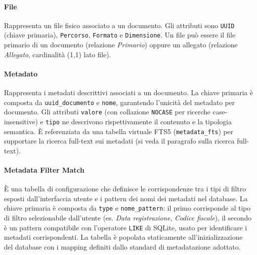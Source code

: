 \documentclass[a4paper,12pt]{article}
\begin{document}
{{{            \paragraph{File}
                Rappresenta un file fisico associato a un documento. Gli attributi sono 
                \texttt{UUID} (chiave primaria), \texttt{Percorso}, \texttt{Formato} e 
                \texttt{Dimensione}. Un file può essere il file primario di un documento 
                (relazione \textit{Primario}) oppure un allegato (relazione 
                \textit{Allegato}, cardinalità (1,1) lato file).

            \paragraph{Metadato}
                Rappresenta i metadati descrittivi associati a un documento. La chiave 
                primaria è composta da \texttt{uuid\_documento} e \texttt{nome}, 
                garantendo l'unicità del metadato per documento. Gli attributi \texttt{valore} 
                (con collazione \texttt{NOCASE} per ricerche case-insensitive) e \texttt{tipo} 
                ne descrivono rispettivamente il contenuto e la tipologia semantica. 
                È referenziata da una tabella virtuale FTS5 (\texttt{metadata\_fts}) per 
                supportare la ricerca full-text sui metadati (si veda il paragrafo 
                sulla ricerca full-text).

            \paragraph{Metadata Filter Match}
                È una tabella di configurazione che definisce le corrispondenze tra i tipi 
                di filtro esposti dall'interfaccia utente e i pattern dei nomi dei metadati 
                nel database. La chiave primaria è composta da \texttt{type} e 
                \texttt{nome\_pattern}: il primo corrisponde al tipo di filtro selezionabile 
                dall'utente (es. \textit{Data registrazione}, \textit{Codice fiscale}), 
                il secondo è un pattern compatibile con l'operatore \texttt{LIKE} di SQLite, 
                usato per identificare i metadati corrispondenti. La tabella è popolata 
                staticamente all'inizializzazione del database con i mapping definiti 
                dallo standard di metadatazione adottato.

}}}
\end{document}
